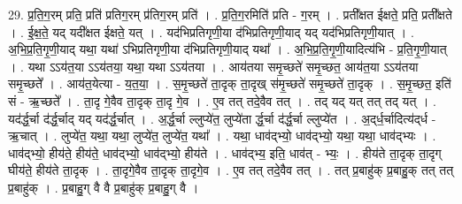 \documentclass[17pt]{extarticle}
\begin{document}
29. प्र॒ति॒ग॒रम् प्रति॒ प्रति॑ प्रतिग॒रम् प्र॑तिग॒रम् प्रति॑ । . प्र॒ति॒ग॒रमिति॑ प्रति - ग॒रम् । . प्रती᳚क्षत ईक्षते॒ प्रति॒ प्रती᳚क्षते । . ई॒क्ष॒ते॒ यद् यदी᳚क्षत ईक्षते॒ यत् । . यद॑भिप्रतिगृणी॒या द॑भिप्रतिगृणी॒याद् यद् यद॑भिप्रतिगृणी॒यात् । . अ॒भि॒प्र॒ति॒गृ॒णी॒याद् यथा॒ यथा॑ ऽभिप्रतिगृणी॒या द॑भिप्रतिगृणी॒याद् यथा᳚ । . अ॒भि॒प्र॒ति॒गृ॒णी॒यादित्य॑भि - प्र॒ति॒गृ॒णी॒यात् । . यथा ऽऽय॑त॒या ऽऽय॑तया॒ यथा॒ यथा ऽऽय॑तया । . आय॑तया समृ॒च्छते॑ समृ॒च्छत॒ आय॑त॒या ऽऽय॑तया समृ॒च्छते᳚ । . आय॑त॒येत्या - य॒त॒या॒ । . स॒मृ॒च्छते॑ ता॒दृक् ता॒दृख् स॑मृ॒च्छते॑ समृ॒च्छते॑ ता॒दृक् । . स॒मृ॒च्छत॒ इति॑ सं - ऋ॒च्छते᳚ । . ता॒दृ गे॒वैव ता॒दृक् ता॒दृ गे॒व । . ए॒व तत् तदे॒वैव तत् । . तद् यद् यत् तत् तद् यत् । . यद॑र्द्ध॒र्चा द॑र्द्ध॒र्चाद् यद् यद॑र्द्ध॒र्चात् । . अ॒र्द्ध॒र्चा ल्लुप्ये॑त॒ लुप्ये॑ता र्द्ध॒र्चा द॑र्द्ध॒र्चा ल्लुप्ये॑त । . अ॒द्‌र्ध॒र्चादित्य॑द्‌र्ध - ऋ॒चात् । . लुप्ये॑त॒ यथा॒ यथा॒ लुप्ये॑त॒ लुप्ये॑त॒ यथा᳚ । . यथा॒ धाव॑द्भ्यो॒ धाव॑द्भ्यो॒ यथा॒ यथा॒ धाव॑द्भ्यः । . धाव॑द्भ्यो॒ हीय॑ते॒ हीय॑ते॒ धाव॑द्भ्यो॒ धाव॑द्भ्यो॒ हीय॑ते । . धाव॑द्भ्य॒ इति॒ धाव॑त् - भ्यः॒ । . हीय॑ते ता॒दृक् ता॒दृग् घीय॑ते॒ हीय॑ते ता॒दृक् । . ता॒दृगे॒वैव ता॒दृक् ता॒दृगे॒व । . ए॒व तत् तदे॒वैव तत् । . तत् प्र॒बाहु॑क् प्र॒बाहु॒क् तत् तत् प्र॒बाहु॑क् । . प्र॒बाहु॒ग् वै वै प्र॒बाहु॑क् प्र॒बाहु॒ग् वै । \newline
\end{document}
